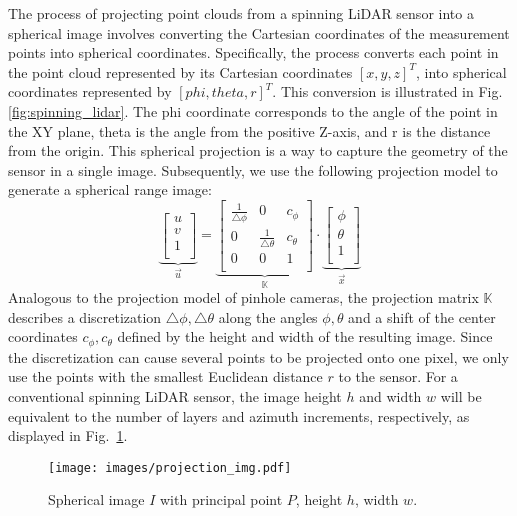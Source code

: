 The process of projecting point clouds from a spinning LiDAR sensor into a spherical image involves converting the Cartesian coordinates of the measurement points into spherical coordinates. Specifically, the process converts each point in the point cloud represented by its Cartesian coordinates $[x,y,z]^T$, into spherical coordinates represented by $[phi, theta, r]^T$. This conversion is illustrated in Fig. \ref{fig:spinning_lidar}. The phi coordinate corresponds to the angle of the point in the XY plane, theta is the angle from the positive Z-axis, and r is the distance from the origin.
This spherical projection is a way to capture the geometry of the sensor in a single image. Subsequently, we use the following projection model to generate a spherical range image:
\begin{equation}
\underbrace{\begin{bmatrix}
 u\\
 v\\
 1\\
\end{bmatrix} }_{\vec{u}}
=
\underbrace{\begin{bmatrix}
\frac{1}{\triangle \phi} &  0 &  c_{\phi}\\
 0 &  \frac{1}{\triangle \theta} &  c_{\theta}\\
 0 & 0 & 1\\
\end{bmatrix}}_{\mathbb{K}} \cdot \underbrace{\begin{bmatrix}
 \phi\\
 \theta\\
 1\\
\end{bmatrix}}_{\vec{x}}  
\end{equation}
Analogous to the projection model of pinhole cameras, the projection matrix $\mathbb{K}$ describes a discretization $\triangle \phi, \triangle \theta$ along the angles $\phi, \theta$ and a shift of the center coordinates $c_{\phi}, c_{\theta}$ defined by the height and width of the resulting image. Since the discretization can cause several points to be projected onto one pixel, we only use the points with the smallest Euclidean distance $r$ to the sensor. For a conventional spinning LiDAR sensor, the image height $h$ and width $w$ will be equivalent to the number of layers and azimuth increments, respectively, as displayed in Fig.~\ref{fig:spherical}.
\begin{figure}[!h] 
    \centering
    \texttt{[image: images/projection\_img.pdf]}
    \caption{Spherical image $I$ with principal point $P$, height $h$, width $w$.}
    \label{fig:spherical}
\end{figure}

